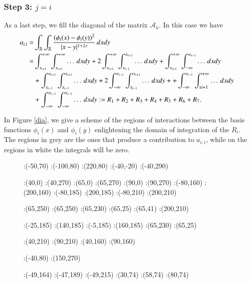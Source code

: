 {\subsubsection*{Step 3: $j= i$}
As a last step, we fill the diagonal of the matrix $\mathcal A_h$. In this case we have
	\begin{align*}
	a_{i,i}= & \int_{\mathbb{R}}\int_{\mathbb{R}}\frac{(\phi_i(x)-\phi_i(y))^2}{|x-y|^{1+2s}}\,dxdy
	\\
	= & \int_{x_{i+1}}^{+\infty}\int_{x_{i+1}}^{+\infty} \ldots\,dxdy + 2\int_{x_{i+1}}^{+\infty}\int_{x_{i-1}}^{x_{i+1}} \ldots\,dxdy + \int_{x_{i+1}}^{+\infty}\int_{-\infty}^{x_{i-1}} \ldots\,dxdy 
	\\
	& + \int_{x_{i-1}}^{x_{i+1}}\int_{x_{i-1}}^{x_{i+1}} \ldots\,dxdy + 2\int_{-\infty}^{x_{i-1}}\int_{x_{i-1}}^{x_{i+1}} \ldots\,dxdy + + \int_{-\infty}^{x_{i-1}}\int_{x{i+1}}^{+\infty} \ldots\,dxdy 
	\\
	& +  \int_{-\infty}^{x_{i-1}}\int_{-\infty}^{x_{i-1}} \ldots\,dxdy := R_1 + R_2 + R_3 + R_4 + R_5 + R_6 + R_7.
\end{align*}

In Figure \ref{dia}, we give a scheme of the regions of interactions between the basis functions $\phi_i(x)$ and $\phi_i(y)$ enlightening the domain of integration of the $R_i$. The regions in grey are the ones that produce a contribution to $a_{i,i}$, while on the regions in white the integrals will be zero.
\begin{figure}
\figinit{0.7pt}
:(-50,70)
:(-100,80) :(220,80)
:(-40,-20) :(-40,290)

:(40,0) :(40,270)
:(65,0) :(65,270)
:(90,0) :(90,270)
%
:(-80,160) :(200,160)
:(-80,185) :(200,185)
:(-80,210) :(200,210)

:(65,250) :(65,250)
:(65,230) :(65,25)
:(65,41) :(200,210)

:(-25,185) :(140,185)
:(-5,185) :(160,185)
:(65,230) :(65,25)

%

:(40,210) :(90,210)
:(40,160) :(90,160)

:(-40,80) :(150,270)

:(-49,164) :(-47,189) :(-49,215) 
:(30,74) :(58,74) :(80,74) 


\end{figure}}
